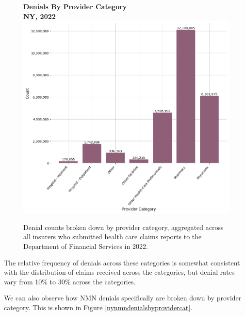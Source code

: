 \documentclass[12pt, a4paper,twoside,parskip=full]{report}
\theoremstyle{plain} %
\theoremstyle{definition} %
\theoremstyle{remark} %
\numberwithin{equation}{chapter}
\begin{document}
	
		\begin{figure}[h!]
			\centering
			\textbf{Denials By Provider Category}\\
			\textbf{NY, 2022}\\
			\includegraphics[width=\columnwidth]{images/ny_claim_reports/denials_by_provider_cat.png}
			\caption{Denial counts broken down by provider category, aggregated across all insurers who submitted health care claims reports to the Department of Financial Services in 2022.}
			\label{nydenialsbyprovidercat}
		\end{figure}
	
		\clearpage
	
		The relative frequency of denials across these categories is somewhat consistent with the distribution of claims received across the categories, but denial rates vary from 10\% to 30\% across the categories.
		
		We can also observe how NMN denials specifically are broken down by provider category. This is shown in Figure \ref{nynmndenialsbyprovidercat}.
		
\end{document}
